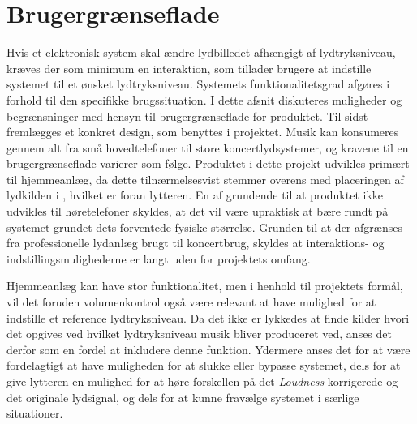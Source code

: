 \chapter{Brugergrænseflade}
\label{Brugergraenseflade}
Hvis et elektronisk system skal ændre lydbilledet afhængigt af lydtryksniveau, kræves der som minimum en interaktion, som tillader brugere at indstille systemet til et ønsket lydtryksniveau. Systemets funktionalitetsgrad afgøres i forhold til den specifikke brugssituation. I dette afsnit diskuteres muligheder og begrænsninger med hensyn til brugergrænseflade for produktet. Til sidst fremlægges et konkret design, som benyttes i projektet.
\blankline
Musik kan konsumeres gennem alt fra små hovedtelefoner til store koncertlydsystemer, og kravene til en brugergrænseflade varierer som følge. Produktet i dette projekt udvikles primært til hjemmeanlæg, da dette tilnærmelsesvist stemmer overens med placeringen af lydkilden i \textcite{STD:ISO226}, hvilket er foran lytteren. En af grundende til at produktet ikke udvikles til høretelefoner skyldes, at det vil være upraktisk at bære rundt på systemet grundet dets forventede fysiske størrelse. Grunden til at der afgrænses fra professionelle lydanlæg brugt til koncertbrug, skyldes at interaktions- og indstillingsmulighederne er langt uden for projektets omfang.\par
Hjemmeanlæg kan have stor funktionalitet, men i henhold til projektets formål, vil det foruden volumenkontrol også være relevant at have mulighed for at indstille et reference lydtryksniveau. Da det ikke er lykkedes at finde kilder hvori det opgives ved hvilket lydtryksniveau musik bliver produceret ved, anses det derfor som en fordel at inkludere denne funktion. Ydermere anses det for at være fordelagtigt at have muligheden for at slukke eller bypasse systemet, dels for at give lytteren en mulighed for at høre forskellen på det \textit{Loudness}-korrigerede og det originale lydsignal, og dels for at kunne fravælge systemet i særlige situationer.

